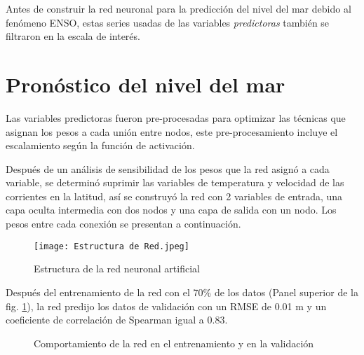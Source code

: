 Antes de construir la red neuronal para la predicción del nivel del mar debido al fenómeno ENSO, estas series usadas de las variables \textit{predictoras} también se filtraron en la escala de interés. 

\section{Pronóstico del nivel del mar}
%
Las variables predictoras fueron pre-procesadas para optimizar las técnicas que asignan los pesos a cada unión entre nodos, este pre-procesamiento incluye el escalamiento según la función de activación. 

Después de un análisis de sensibilidad de los pesos que la red asignó a cada variable, se determinó suprimir las variables de temperatura y velocidad de las corrientes en la latitud, así se construyó la red con 2 variables de entrada, una capa oculta intermedia con dos nodos y una capa de salida con un nodo. Los pesos entre cada conexión se presentan a continuación.

\begin{figure}[H]
	\centering
	\texttt{[image: Estructura de Red.jpeg]}
	\caption{Estructura de la red neuronal artificial}
\end{figure}

\newpage

Después del entrenamiento de la red con el 70\% de los datos (Panel superior de la fig. \ref{fig:global_net}), la red predijo los datos de validación con un RMSE de 0.01 m y un coeficiente de correlación de Spearman igual a 0.83.

\begin{figure}[H]
\centering
{}
\newline
{}
\caption{Comportamiento de la red en el entrenamiento y en la validación}
\label{fig:global_net}
\end{figure}
%
%
%
%
%
%
